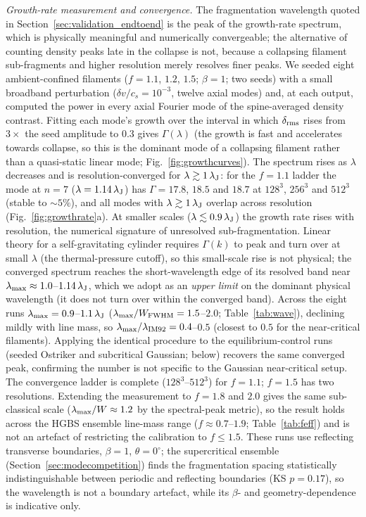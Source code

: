 \documentclass[usenatbib,twoside,twocolumn]{mnras}
\begin{document}
\emph{Growth-rate measurement and convergence.} The fragmentation wavelength quoted in Section~\ref{sec:validation_endtoend} is the peak of the growth-rate spectrum, which is physically meaningful and numerically convergeable; the alternative of counting density peaks late in the collapse is not, because a collapsing filament sub-fragments and higher resolution merely resolves finer peaks. We seeded eight ambient-confined filaments ($f=1.1$, $1.2$, $1.5$; $\beta=1$; two seeds) with a small broadband perturbation ($\delta v/c_s=10^{-3}$, twelve axial modes) and, at each output, computed the power in every axial Fourier mode of the spine-averaged density contrast. Fitting each mode's growth over the interval in which $\delta_{\rm rms}$ rises from $3\times$ the seed amplitude to $0.3$ gives $\Gamma(\lambda)$ (the growth is fast and accelerates towards collapse, so this is the dominant mode of a collapsing filament rather than a quasi-static linear mode; Fig.~\ref{fig:growthcurves}). The spectrum rises as $\lambda$ decreases and is resolution-converged for $\lambda\gtrsim1\,\lambda_{\rm J}$: for the $f=1.1$ ladder the mode at $n=7$ ($\lambda=1.14\,\lambda_{\rm J}$) has $\Gamma=17.8$, $18.5$ and $18.7$ at $128^3$, $256^3$ and $512^3$ (stable to $\sim5\%$), and all modes with $\lambda\gtrsim1\,\lambda_{\rm J}$ overlap across resolution (Fig.~\ref{fig:growthrate}a). At smaller scales ($\lambda\lesssim0.9\,\lambda_{\rm J}$) the growth rate rises with resolution, the numerical signature of unresolved sub-fragmentation. Linear theory for a self-gravitating cylinder requires $\Gamma(k)$ to peak and turn over at small $\lambda$ (the thermal-pressure cutoff), so this small-scale rise is not physical; the converged spectrum reaches the short-wavelength edge of its resolved band near $\lambda_{\rm max}\approx1.0$--$1.14\,\lambda_{\rm J}$, which we adopt as an \emph{upper limit} on the dominant physical wavelength (it does not turn over within the converged band). Across the eight runs $\lambda_{\rm max}=0.9$--$1.1\,\lambda_{\rm J}$ ($\lambda_{\rm max}/W_{\rm FWHM}=1.5$--$2.0$; Table~\ref{tab:wave}), declining mildly with line mass, so $\lambda_{\rm max}/\lambda_{\rm IM92}=0.4$--$0.5$ (closest to $0.5$ for the near-critical filaments). Applying the identical procedure to the equilibrium-control runs (seeded Ostriker and subcritical Gaussian; below) recovers the same converged peak, confirming the number is not specific to the Gaussian near-critical setup. The convergence ladder is complete ($128^3$--$512^3$) for $f=1.1$; $f=1.5$ has two resolutions. Extending the measurement to $f=1.8$ and $2.0$ gives the same sub-classical scale ($\lambda_{\rm max}/W\approx1.2$ by the spectral-peak metric), so the result holds across the HGBS ensemble line-mass range ($f\approx0.7$--$1.9$; Table~\ref{tab:feff}) and is not an artefact of restricting the calibration to $f\le1.5$. These runs use reflecting transverse boundaries, $\beta=1$, $\theta=0^\circ$; the supercritical ensemble (Section~\ref{sec:modecompetition}) finds the fragmentation spacing statistically indistinguishable between periodic and reflecting boundaries (KS $p=0.17$), so the wavelength is not a boundary artefact, while its $\beta$- and geometry-dependence is indicative only.
\end{document}
